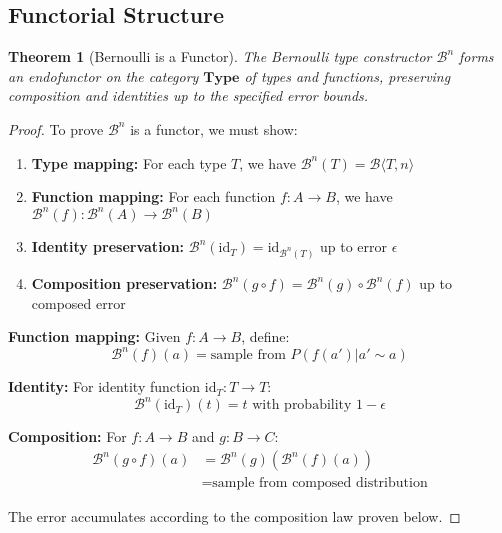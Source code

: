 \documentclass[11pt,final,hidelinks]{article}
\newtheorem{theorem}{Theorem}[section]
\newcommand{\bernoulli}[2]{\mathcal{B}\langle #1, #2 \rangle}
\begin{document}
\subsection{Functorial Structure}

\begin{theorem}[Bernoulli is a Functor]
The Bernoulli type constructor $\mathcal{B}^n$ forms an endofunctor on the category $\mathbf{Type}$ of types and functions, preserving composition and identities up to the specified error bounds.
\end{theorem}

\begin{proof}
To prove $\mathcal{B}^n$ is a functor, we must show:
\begin{enumerate}
    \item \textbf{Type mapping:} For each type $T$, we have $\mathcal{B}^n(T) = \bernoulli{T}{n}$
    \item \textbf{Function mapping:} For each function $f: A \to B$, we have $\mathcal{B}^n(f): \mathcal{B}^n(A) \to \mathcal{B}^n(B)$
    \item \textbf{Identity preservation:} $\mathcal{B}^n(\text{id}_T) = \text{id}_{\mathcal{B}^n(T)}$ up to error $\epsilon$
    \item \textbf{Composition preservation:} $\mathcal{B}^n(g \circ f) = \mathcal{B}^n(g) \circ \mathcal{B}^n(f)$ up to composed error
\end{enumerate}

\textbf{Function mapping:} Given $f: A \to B$, define:
\begin{equation}
\mathcal{B}^n(f)(a) = \text{sample from } P(f(a') | a' \sim a)
\end{equation}

\textbf{Identity:} For identity function $\text{id}_T: T \to T$:
\begin{equation}
\mathcal{B}^n(\text{id}_T)(t) = t \text{ with probability } 1 - \epsilon
\end{equation}

\textbf{Composition:} For $f: A \to B$ and $g: B \to C$:
\begin{align}
\mathcal{B}^n(g \circ f)(a) &= \mathcal{B}^n(g)(\mathcal{B}^n(f)(a)) \\
&= \text{sample from composed distribution}
\end{align}

The error accumulates according to the composition law proven below.
\end{proof}
\end{document}
